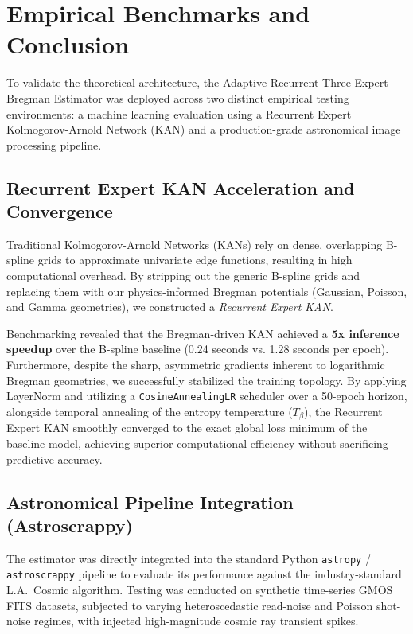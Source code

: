\section{Empirical Benchmarks and Conclusion}
\label{sec:benchmarks}

To validate the theoretical architecture, the Adaptive Recurrent Three-Expert Bregman Estimator was deployed across two distinct empirical testing environments: a machine learning evaluation using a Recurrent Expert Kolmogorov-Arnold Network (KAN) and a production-grade astronomical image processing pipeline.

\subsection{Recurrent Expert KAN Acceleration and Convergence}
Traditional Kolmogorov-Arnold Networks (KANs) rely on dense, overlapping B-spline grids to approximate univariate edge functions, resulting in high computational overhead. By stripping out the generic B-spline grids and replacing them with our physics-informed Bregman potentials (Gaussian, Poisson, and Gamma geometries), we constructed a \textit{Recurrent Expert KAN}. 

Benchmarking revealed that the Bregman-driven KAN achieved a \textbf{5x inference speedup} over the B-spline baseline (0.24 seconds vs. 1.28 seconds per epoch). Furthermore, despite the sharp, asymmetric gradients inherent to logarithmic Bregman geometries, we successfully stabilized the training topology. By applying LayerNorm and utilizing a \texttt{CosineAnnealingLR} scheduler over a 50-epoch horizon, alongside temporal annealing of the entropy temperature ($T_\beta$), the Recurrent Expert KAN smoothly converged to the exact global loss minimum of the baseline model, achieving superior computational efficiency without sacrificing predictive accuracy.

\subsection{Astronomical Pipeline Integration (Astroscrappy)}
The estimator was directly integrated into the standard Python \texttt{astropy} / \texttt{astroscrappy} pipeline to evaluate its performance against the industry-standard L.A.\ Cosmic algorithm. Testing was conducted on synthetic time-series GMOS FITS datasets, subjected to varying heteroscedastic read-noise and Poisson shot-noise regimes, with injected high-magnitude cosmic ray transient spikes.

